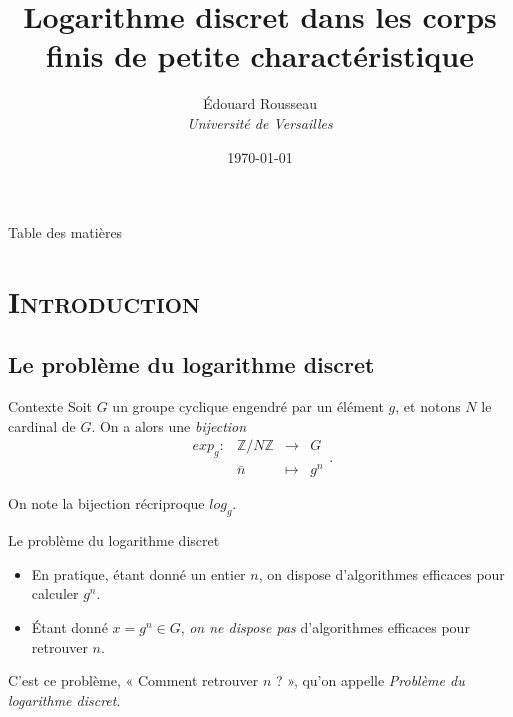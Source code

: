 \documentclass[xcolor=x11names,compress]{beamer}
\theoremstyle{break}
\theoremstyle{sc}
\theoremstyle{definition}
\theoremstyle{remark}
\begin{document}
\begin{frame}
  \title{Logarithme discret dans les corps finis de petite charactéristique}
\author{
Édouard Rousseau\\
{\it Université de Versailles\\}
}
\date{\today}
\titlepage
\end{frame}

\begin{frame}{Table des matières}
\tableofcontents
\end{frame}

\section{\scshape Introduction}
\subsection{Le problème du logarithme discret}
\begin{frame}{Contexte}
  Soit $G$ un groupe cyclique engendré par un élément $g$, et notons $N$ le
  cardinal de $G$. On a alors une \emph{bijection}
  \[
    \begin{array}{cccc}
      exp_g: & \mathbb{Z}/N\mathbb{Z} & \to & G \\
      & \bar n & \mapsto & g^n
    \end{array}.
  \]

  On note la bijection récriproque $log_g$. 
\end{frame}

\begin{frame}{Le problème du logarithme discret}
  \begin{itemize}
    \item En pratique, étant donné un entier $n$, on dispose d'algorithmes efficaces
  pour calculer $g^n$.
\item Étant donné $x = g^n\in G$, \emph{on ne dispose pas} d'algorithmes efficaces
  pour retrouver $n$.
  \end{itemize}
  C'est ce problème, « Comment retrouver $n$ ? », qu'on appelle \emph{Problème
  du logarithme discret}.
\end{frame}
\end{document}
